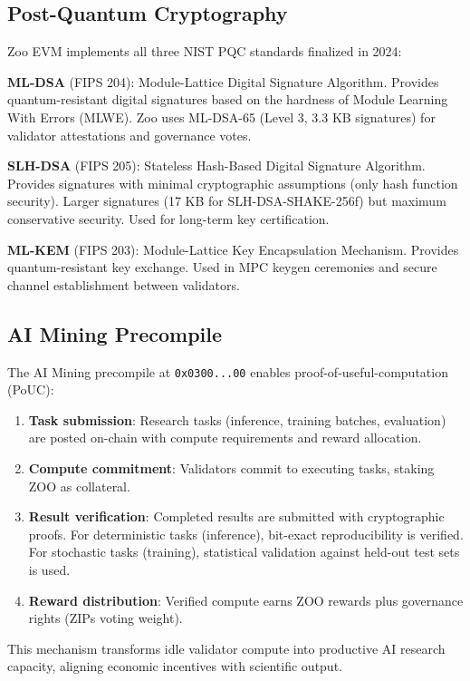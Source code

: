 \subsection{Post-Quantum Cryptography}

Zoo EVM implements all three NIST PQC standards finalized in 2024:

\textbf{ML-DSA} (FIPS 204): Module-Lattice Digital Signature Algorithm. Provides quantum-resistant digital signatures based on the hardness of Module Learning With Errors (MLWE). Zoo uses ML-DSA-65 (Level 3, 3.3 KB signatures) for validator attestations and governance votes.

\textbf{SLH-DSA} (FIPS 205): Stateless Hash-Based Digital Signature Algorithm. Provides signatures with minimal cryptographic assumptions (only hash function security). Larger signatures (17 KB for SLH-DSA-SHAKE-256f) but maximum conservative security. Used for long-term key certification.

\textbf{ML-KEM} (FIPS 203): Module-Lattice Key Encapsulation Mechanism. Provides quantum-resistant key exchange. Used in MPC keygen ceremonies and secure channel establishment between validators.

\subsection{AI Mining Precompile}

The AI Mining precompile at \texttt{0x0300...00} enables proof-of-useful-computation (PoUC):

\begin{enumerate}[nosep]
  \item \textbf{Task submission}: Research tasks (inference, training batches, evaluation) are posted on-chain with compute requirements and reward allocation.
  \item \textbf{Compute commitment}: Validators commit to executing tasks, staking ZOO as collateral.
  \item \textbf{Result verification}: Completed results are submitted with cryptographic proofs. For deterministic tasks (inference), bit-exact reproducibility is verified. For stochastic tasks (training), statistical validation against held-out test sets is used.
  \item \textbf{Reward distribution}: Verified compute earns ZOO rewards plus governance rights (ZIPs voting weight).
\end{enumerate}

This mechanism transforms idle validator compute into productive AI research capacity, aligning economic incentives with scientific output.

